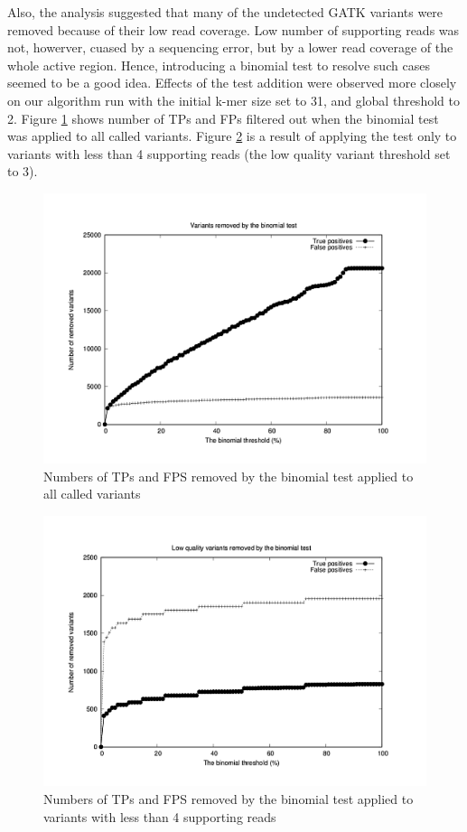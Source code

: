 Also, the analysis suggested that many of the undetected GATK variants were removed because of their low read coverage. Low number of supporting reads was not, howerver, cuased by a sequencing error, but by a lower read coverage of the whole active region. Hence, introducing a binomial test to resolve such cases seemed to be a good idea. Effects of the test addition were observed more closely on our algorithm run with the initial k-mer size set to 31, and global threshold to 2. Figure \ref{fig:binom-all} shows number of TPs and FPs filtered out when the binomial test was applied to all called variants. Figure \ref{fig:binom-3} is a result of applying the test only to variants with less than 4 supporting reads (the low quality variant threshold set to 3).

\begin{figure}
	\centering
	\includegraphics{img/binom-all.pdf}
	\caption{Numbers of TPs and FPS removed by the binomial test applied to all called variants}
	\label{fig:binom-all}
\end{figure}

\begin{figure}
	\centering
	\includegraphics{img/binom-3.pdf}
	\caption{Numbers of TPs and FPS removed by the binomial test applied to variants with less than 4 supporting reads}
	\label{fig:binom-3}
\end{figure}

